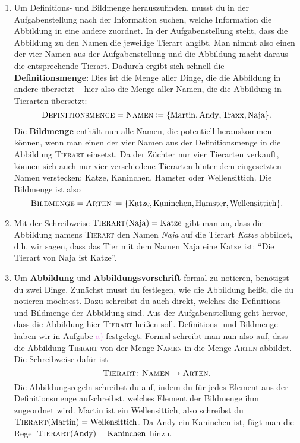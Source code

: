 \documentclass[../funktionen.tex]{subfiles}
\begin{document}
    \begin{solution}
        \begin{enumerate}
            \item Um Definitions- und Bildmenge herauszufinden, musst du in der Aufgabenstellung nach der Information suchen, welche Information die Abbildung in eine andere zuordnet. In der Aufgabenstellung steht, dass die Abbildung zu den Namen die jeweilige Tierart angibt. Man nimmt also einen der vier Namen aus der Aufgabenstellung und die Abbildung macht daraus die entsprechende Tierart. Dadurch ergibt sich schnell die \textbf{Definitionsmenge}: Dies ist die Menge aller Dinge, die die Abbildung in andere übersetzt -- hier also die Menge aller Namen, die die Abbildung in Tierarten übersetzt:
            \[\textsc{Definitionsmenge}=\textsc{Namen}\coloneqq\{\text{Martin}, \text{Andy}, \text{Traxx}, \text{Naja}\}.\]
            Die \textbf{Bildmenge} enthält nun alle Namen, die potentiell herauskommen können, wenn man einen der vier Namen aus der Definitionsmenge in die Abbildung \textsc{Tierart} einsetzt. Da der Züchter nur vier Tierarten verkauft, können sich auch nur vier verschiedene Tierarten hinter dem eingesetzten Namen verstecken: Katze, Kaninchen, Hamster oder Wellensittich. Die Bildmenge ist also
            \[\textsc{Bildmenge}=\textsc{Arten}\coloneqq\{\text{Katze}, \text{Kaninchen}, \text{Hamster}, \text{Wellensittich}\}.\]
            
            \item Mit der Schreibweise $\textsc{Tierart}(\text{Naja})=\text{Katze}$ gibt man an, dass die Abbildung namens \textsc{Tierart} den Namen \emph{Naja} auf die Tierart \emph{Katze} abbildet, d.h. wir sagen, dass das Tier mit dem Namen Naja eine Katze ist: \enquote{Die Tierart von Naja ist Katze}.
            
            \item Um \textbf{Abbildung} und \textbf{Abbildungsvorschrift} formal zu notieren, benötigst du zwei Dinge. Zunächst musst du festlegen, wie die Abbildung heißt, die du notieren möchtest. Dazu schreibst du auch direkt, welches die Definitions- und Bildmenge der Abbildung sind. Aus der Aufgabenstellung geht hervor, dass die Abbildung hier \textsc{Tierart} heißen soll. Definitions- und Bildmenge haben wir in Aufgabe \textcolor{violet}{a)} festgelegt. Formal schreibt man nun also auf, dass die Abbildung \textsc{Tierart} von der Menge \textsc{Namen} in die Menge \textsc{Arten} abbildet. Die Schreibweise dafür ist
            \[\textsc{Tierart}\colon\textsc{Namen}\rightarrow\textsc{Arten}.\]
            Die Abbildungsregeln schreibst du auf, indem du für jedes Element aus der Definitionsmenge aufschreibst, welches Element der Bildmenge ihm zugeordnet wird. Martin ist ein Wellensittich, also schreibst du $\textsc{Tierart}(\text{Martin})=\text{Wellensittich}$. Da Andy ein Kaninchen ist, fügt man die Regel $\textsc{Tierart}(\text{Andy})=\text{Kaninchen}$ hinzu.
            

\end{enumerate}
\end{solution}
\end{document}
